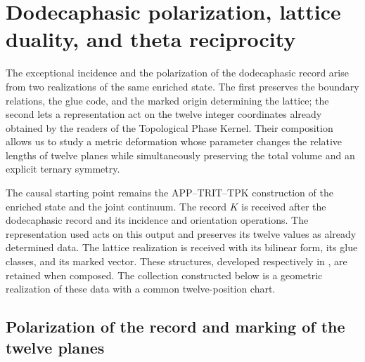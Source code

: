 \section{Dodecaphasic polarization, lattice duality, and theta reciprocity}
\label{sec:leech-dualidad}

The exceptional incidence and the polarization of the dodecaphasic record
arise from two realizations of the same enriched state. The first
preserves the boundary relations, the glue code, and the marked
origin determining the lattice; the second lets a
representation act on the twelve integer coordinates already obtained by the
readers of the Topological Phase Kernel. Their composition allows us to study
a metric deformation whose parameter changes the relative lengths
of twelve planes while simultaneously preserving the total volume and an
explicit ternary symmetry.

The causal starting point remains the APP--TRIT--TPK
construction of the enriched state and the joint continuum.
The record \(K\) is received after the dodecaphasic record and its
incidence and orientation operations. The representation used
acts on this output and preserves its twelve values as already
determined data. The lattice realization is received with its bilinear form,
its glue classes, and its marked vector. These structures, developed
respectively in \cite{hmtX,HMT-IV}, are retained when composed.
The collection constructed below is a geometric realization
of these data with a common twelve-position chart.

\subsection{Polarization of the record and marking of the twelve planes}
\label{subsec:leech-polarizacion}

